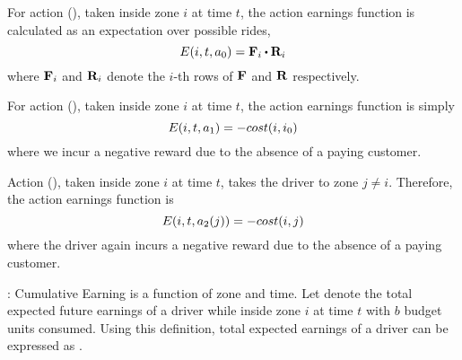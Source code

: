\squishlist
    \item For action {\getpassengeraction} ({\getpassenger}), taken inside zone $i$ at time $t$, the action earnings function
    is calculated as an expectation over possible rides,
    \begin{equation}\label{eq:a0}
    \actionearning{i}{t}{a_0} = \empiricaltransitionmatrix_{i}\bigcdot \rewardsmatrix_{i}
    \end{equation}
    where ${\mathbf{F}}_{i}$ and ${\mathbf{R}}_{i}$ denote the $i$-th rows of ${\mathbf{F}}$ and ${\mathbf{R}}$ respectively. 
    
    \item For action {\gohomeaction} ({\gohome}), taken inside zone $i$ at time $t$, the action earnings function is simply
    \begin{equation}\label{eq:a1}
    E({i},{t},{a_1}) = - cost(i,{i_0})
    \end{equation}
    where we incur a negative reward due to the absence of a paying customer. 

    \item Action {\relocateaction} ({\relocate}), taken inside zone $i$ at time $t$, 
    takes the driver to zone $j \neq i$. Therefore, the action earnings function is 
    \begin{equation}\label{eq:a2}
    E({i},{t},{a_2(j)}) = - cost(i,j)
    \end{equation}
    where the driver again incurs a negative reward due to the absence of a paying customer. 
\squishend

\iffalse
{}:
Cumulative Earning is a function of zone and time. Let {} denote the total expected future earnings of a driver
while inside zone $i$ at time $t$ with $b$ budget units consumed. Using this definition, total expected earnings of a driver can be expressed
as {}.

